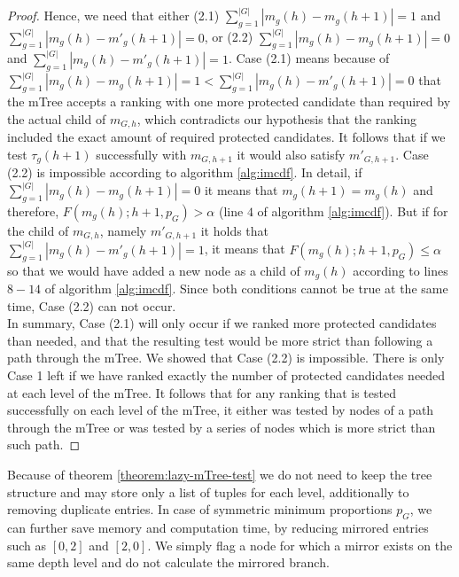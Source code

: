 \begin{proof}
	Hence, we need that either
	(2.1) $\sum_{g=1}^{|G|} |m_{g}(h) - m_g(h+1)| = 1$ and $\sum_{g=1}^{|G|} |m_{g}(h) - m'_g(h+1)| = 0$,
	or
	(2.2) $\sum_{g=1}^{|G|} |m_{g}(h) - m_g(h+1)| = 0$ and $\sum_{g=1}^{|G|} |m_{g}(h) - m'_g(h+1)| = 1$.
	Case (2.1) means because of $\sum_{g=1}^{|G|} |m_{g}(h) - m_g(h+1)| = 1 < \sum_{g=1}^{|G|} |m_{g}(h) - m'_g(h+1)| = 0$ that the mTree accepts a ranking with one more protected candidate than required by the actual child of $m_{G,h}$, which contradicts our hypothesis that the ranking included the exact amount of required protected candidates. It follows that if we test $\tau_g (h+1)$ successfully with $m_{G,h+1}$ it would also satisfy ${m'}_{G,h+1}$.
Case (2.2) is impossible according to algorithm \ref{alg:imcdf}.
In detail, if $\sum_{g=1}^{|G|} |m_{g}(h) - m_g(h+1)| = 0$ it means that $ m_g(h+1) = m_{g}(h)$ and therefore, $F(m_{g}(h);h+1,p_G) > \alpha$ (line $4$ of algorithm \ref{alg:imcdf}). But if for the child of $m_{G,h}$, namely ${m'}_{G,h+1}$ it holds that $\sum_{g=1}^{|G|} |m_{g}(h) - m'_g(h+1)| = 1$, it means that
$F(m_{g}(h);h+1,p_G) \leq \alpha$ so that we would have added a new node as a child of $m_{g}(h)$ according to lines  $8-14$ of algorithm \ref{alg:imcdf}. Since both conditions cannot be true at the same time, Case (2.2) can not occur.
\\
In summary, Case (2.1) will only occur if we ranked more protected candidates than needed, and that the resulting test would be more strict than following a path through the mTree.
%
We showed that Case (2.2) is impossible. There is only Case 1 left if we have ranked exactly the number of protected candidates needed at each level of the mTree.
%
It follows that for any ranking that is tested successfully on each level of the mTree, it either was tested by nodes of a path through the mTree or was tested by a series of nodes which is more strict than such path.
\end{proof}
%
\noindent Because of theorem \ref{theorem:lazy-mTree-test} we do not need to keep the tree structure and may store only a list of tuples for each level, additionally to removing duplicate entries.
%
In case of symmetric minimum proportions $p_G$, we can further save memory and computation time, by reducing mirrored entries such as $[0,2]$ and $[2,0]$.
%
We simply flag a node for which a mirror exists on the same depth level and do not calculate the mirrored branch.

